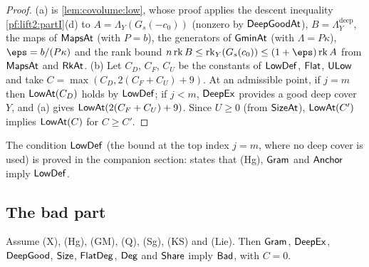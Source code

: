 \begin{proof}
(a) is \cref{lem:covolume:low}, whose proof applies the descent inequality \cref{pf:lift2:partI}(d) to
$A=\Lambda_Y(G_s(-c_0))$ (nonzero by $\mathsf{DeepGoodAt}$), $B=\Lambda^{\mathrm{deep}}_Y$, the maps of $\mathsf{MapsAt}$
(with $P=b$), the generators of $\mathsf{GminAt}$ (with $\Lambda=P\kappa$), $\eps=b/(P\kappa)$ and the rank bound
$n\lifttwork B\le\lifttwork_Y(G_s(c_0))\le(1+\eps)\lifttwork A$ from $\mathsf{MapsAt}$ and $\mathsf{RkAt}$. (b) Let
$C_D$, $C_F$, $C_U$ be the constants of $\mathsf{LowDef}$, $\mathsf{Flat}$, $\mathsf{ULow}$ and take
$C=\max(C_D,2(C_F+C_U)+9)$. At an admissible point, if $j=m$ then $\mathsf{LowAt}(C_D)$ holds by $\mathsf{LowDef}$; if
$j<m$, $\mathsf{DeepEx}$ provides a good deep cover $Y$, and (a) gives $\mathsf{LowAt}(2(C_F+C_U)+9)$. Since $U\ge0$
(from $\mathsf{SizeAt}$), $\mathsf{LowAt}(C')$ implies $\mathsf{LowAt}(C)$ for $C\ge C'$.
\end{proof}

The condition $\mathsf{LowDef}$ (the bound at the top index $j=m$, where no deep cover is used) is proved in the
companion section:  states that \textup{(Hg)}, $\mathsf{Gram}$ and
$\mathsf{Anchor}$ imply $\mathsf{LowDef}$.

\subsection{The bad part}\label{sec:pf:lift2:bad}

\begin{proposition}\label{pf:lift2:bad}
Assume \textup{(X)}, \textup{(Hg)}, \textup{(GM)}, \textup{(Q)}, \textup{(Sg)}, \textup{(KS)} and \textup{(Lie)}. Then $\mathsf{Gram}$, $\mathsf{DeepEx}$, $\mathsf{DeepGood}$,
$\mathsf{Size}$, $\mathsf{FlatDeg}$, $\mathsf{Deg}$ and $\mathsf{Share}$ imply $\mathsf{Bad}$, with $C=0$.
\end{proposition}

